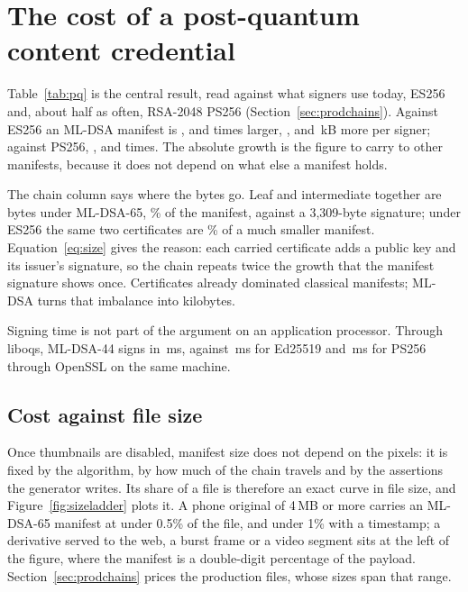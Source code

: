 \section{The cost of a post-quantum content credential}
\label{sec:cost}



Table~\ref{tab:pq} is the central result, read against what signers use
today, ES256 and, about half as often, RSA-2048 PS256
(Section~\ref{sec:prodchains}). Against ES256 an ML-DSA manifest is
\NvsESDSAfortyfour{}, \NvsESDSAsixtyfive{} and \NvsESDSAeightyseven{} times
larger, \NdeltaESDSAfortyfour{}, \NdeltaESDSAsixtyfive{} and
\NdeltaESDSAeightyseven\,kB more per signer; against PS256, \NvsPSDSAfortyfour{},
\NvsPSDSAsixtyfive{} and \NvsPSDSAeightyseven{} times. The absolute growth is
the figure to carry to other manifests, because it does not depend on what
else a manifest holds.

The chain column says where the bytes go. Leaf and intermediate together are
\NchainBytesDSAsixtyfive{} bytes under ML-DSA-65, \NchainShareManDSAsixtyfive\%
of the manifest, against a 3,309-byte signature; under ES256 the same two
certificates are \NchainShareManES\% of a much smaller manifest.
Equation~\ref{eq:size} gives the reason: each carried certificate adds a
public key and its issuer's signature, so the chain repeats twice the growth
that the manifest signature shows once. Certificates already dominated
classical manifests; ML-DSA turns that imbalance into kilobytes.

Signing time is not part of the argument on an application processor.
Through liboqs, ML-DSA-44 signs in \NsignMsDSAfortyfour\,ms, against
\NsignMsEd\,ms for Ed25519 and \NsignMsPS\,ms for PS256 through OpenSSL on
the same machine.

\subsection{Cost against file size}
\label{sec:denominator}

Once thumbnails are disabled, manifest size does not depend on the pixels: it
is fixed by the algorithm, by how much of the chain travels and by the
assertions the generator writes. Its share of a file is therefore an exact
curve in file size, and Figure~\ref{fig:sizeladder} plots it. A phone original
of 4\,MB or more carries an ML-DSA-65 manifest at under 0.5\% of the file, and
under 1\% with a timestamp; a
derivative served to the web, a burst frame or a video segment sits at the
left of the figure, where the manifest is a double-digit percentage of the
payload. Section~\ref{sec:prodchains} prices the production files, whose
sizes span that range.

